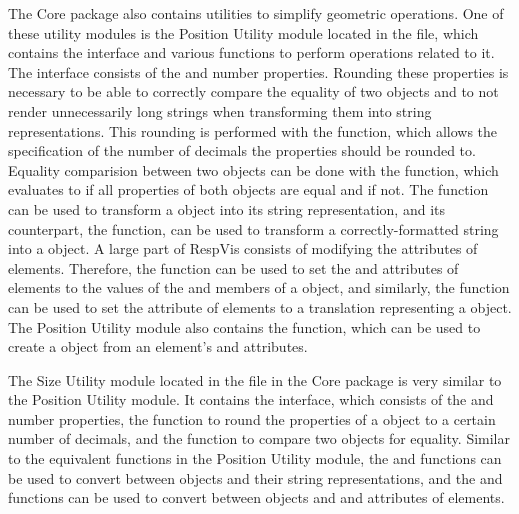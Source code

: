 The Core package also contains utilities to simplify
geometric operations. One of these utility modules is the
Position Utility module located in the
 file, which contains the 
interface and various functions to perform operations related to it.
The  interface consists of the  and 
number properties. Rounding these properties is necessary to be able
to correctly compare the equality of two  objects and
to not render unnecessarily long strings when transforming them into
string representations. This rounding is performed with the
 function, which allows the specification of the
number of decimals the properties should be rounded to. Equality
comparision between two  objects can be done with the
 function, which evaluates to  if all
properties of both  objects are equal and 
if not. The  function can be used to transform
a  object into its  string
representation, and its counterpart, the 
function, can be used to transform a correctly-formatted string into a
 object. A large part of RespVis consists of modifying
the attributes of elements. Therefore, the 
function can be used to set the  and 
attributes of elements to the values of the  and 
members of a  object, and similarly, the
 function can be used to set the
 attribute of elements to a translation
representing a  object. The Position Utility
module also contains the  function, which can
be used to create a  object from an element's
 and  attributes.

The Size Utility module located in the
 file in the Core package is very
similar to the Position Utility module. It contains the
 interface, which consists of the  and
 number properties, the  function to
round the properties of a  object to a certain number of
decimals, and the  function to compare two
 objects for equality. Similar to the equivalent functions
in the Position Utility module, the  and
 functions can be used to convert between
 objects and their string representations, and the
 and  functions can be used to
convert between  objects and  and
 attributes of elements.

